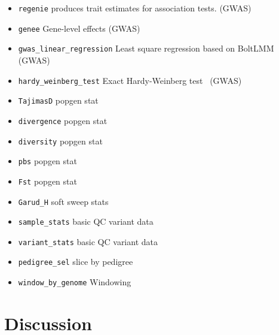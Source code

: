 \documentclass[a4paper,num-refs]{oup-contemporary}
\newcommand{\sgapi}[1]{\texttt{#1}}
\begin{document}
\begin{itemize}
\item \sgapi{regenie} produces trait estimates for association tests.
\citep{mbatchou2021computationally} (GWAS)
\item \sgapi{genee} Gene-level effects
\citep{cheng2020estimation} (GWAS)
\item \sgapi{gwas\_linear\_regression} Least square regression based
on BoltLMM~\citep{loh2015efficient} (GWAS)
\item \sgapi{hardy\_weinberg\_test} Exact Hardy-Weinberg
test~\citep{wigginton2005note} (GWAS)

\item \sgapi{TajimasD} popgen stat
\item \sgapi{divergence} popgen stat
\item \sgapi{diversity} popgen stat
\item \sgapi{pbs} popgen stat
\item \sgapi{Fst} popgen stat
\item \sgapi{Garud\_H} soft sweep stats~\citep{garud2015recent}


\item \sgapi{sample\_stats} basic QC variant data

\item \sgapi{variant\_stats} basic QC variant data

\item \sgapi{pedigree\_sel} slice by pedigree

\item \sgapi{window\_by\_genome} Windowing

\end{itemize}





\section{Discussion}
\end{document}

